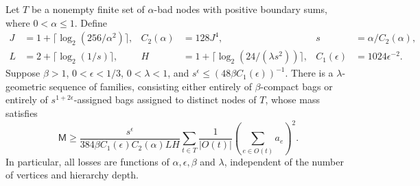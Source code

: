 \begin{proposition}\label{prop:hierarchy-bags}
Let $T$ be a nonempty finite set of $\alpha$-bad nodes with positive boundary
sums, where $0<\alpha\le1$.  Define
\[
 \begin{aligned}
 J&=1+\lceil\log_2(256/\alpha^2)\rceil,
 &C_2(\alpha)&=128J^4,
 &s&=\alpha/C_2(\alpha),\\
 L&=2+\lceil\log_2(1/s)\rceil,
 &H&=1+\lceil\log_2(24/(\lambda s^2))\rceil,
 &C_1(\epsilon)&=1024\epsilon^{-2}.
 \end{aligned}
\]
Suppose $\beta>1$, $0<\epsilon<1/3$, $0<\lambda<1$, and
$s^\epsilon\le(48\beta C_1(\epsilon))^{-1}$.
There is a $\lambda$-geometric sequence of families, consisting either
entirely of $\beta$-compact bags or entirely of
$s^{1+2\epsilon}$-assigned bags assigned to distinct nodes of $T$,
whose mass satisfies
\begin{equation}\label{hb:extraction-bound}
 \mathsf M\ge
 \frac{s^\epsilon}{384\beta C_1(\epsilon)C_2(\alpha)LH}
 \sum_{t\in T}\frac1{|O(t)|}
                  \left(\sum_{e\in O(t)}a_e\right)^2.
\end{equation}
In particular, all losses are functions of $\alpha,\epsilon,\beta$
and $\lambda$, independent of the number of vertices and hierarchy depth.
\end{proposition}
